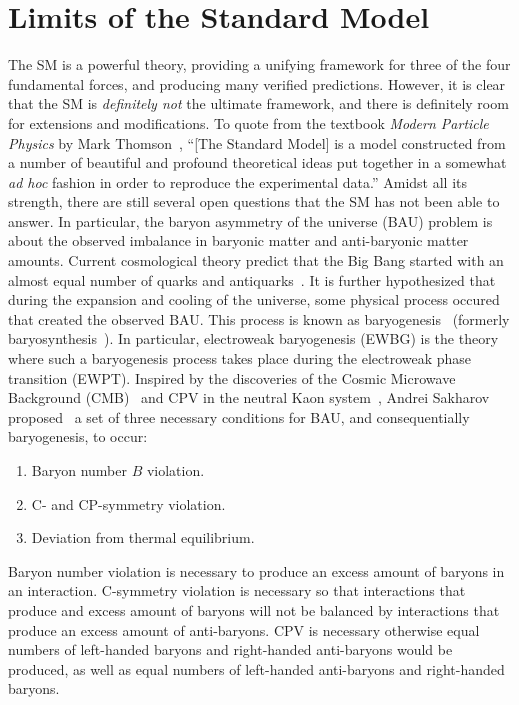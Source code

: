\section{Limits of the Standard Model}
The SM is a powerful theory, providing a unifying framework for three of the four fundamental forces, and producing many verified predictions.
However, it is clear that the SM is \textit{definitely not} the ultimate framework, and there is definitely room for extensions and modifications.
To quote from the textbook \textit{Modern Particle Physics} by Mark Thomson~\cite{Thomson2013ParticleTextbook},
``[The Standard Model] is a model constructed from a number of beautiful and profound theoretical ideas
put together in a somewhat \textit{ad hoc} fashion in order to reproduce the experimental data.''
Amidst all its strength, there are still several open questions that the SM has not been able to answer.
In particular, the baryon asymmetry of the universe (BAU) problem is about the observed imbalance in baryonic matter and anti-baryonic matter amounts.
Current cosmological theory predict that the Big Bang started with an almost equal number of quarks and antiquarks~\cite{Sarkar2007AstroparticlePhysics}.
It is further hypothesized that during the expansion and cooling of the universe, some physical process occured that created the observed BAU.
This process is known as baryogenesis~\cite{Liddle2015Cosmology} (formerly baryosynthesis~\cite{BarrowTurner1981Baryosynthesis,Turner1981GUT}).
In particular, electroweak baryogenesis (EWBG) is the theory where such a baryogenesis process takes place during the electroweak phase transition (EWPT).
Inspired by the discoveries of the Cosmic Microwave Background (CMB)~\cite{PenziasWilson1965CMB} and CPV in the neutral Kaon system~\cite{CroninFitch1964KaonCPV},
Andrei Sakharov proposed~\cite{Sakharov1967BAU} a set of three necessary conditions for BAU, and consequentially baryogenesis, to occur:
\begin{enumerate}
  \item Baryon number \(B \) violation.
  \item C- and CP-symmetry violation.
  \item Deviation from thermal equilibrium.
\end{enumerate}
Baryon number violation is necessary to produce an excess amount of baryons in an interaction.
C-symmetry violation is necessary so that interactions that produce and excess amount of baryons will not be balanced by interactions that produce an excess amount of anti-baryons.
CPV is necessary otherwise equal numbers of left-handed baryons and right-handed anti-baryons would be produced, as well as equal numbers of left-handed anti-baryons and right-handed baryons.
